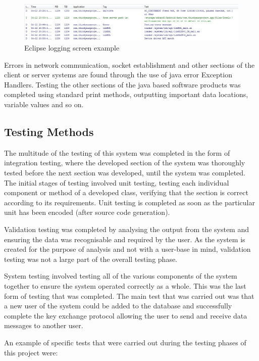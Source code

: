 \documentclass[a4paper,12pt]{report}
\begin{document}
\begin{figure}[htb]
 \centering
 \includegraphics[scale=0.5]{images/screenshots/logcatex.jpg}
 \caption{Eclipse logging screen example}
 \label{fig:logcatex}
\end{figure}

Errors in network communication, socket establishment and other sections of the client or server systems are found through the use of java error Exception Handlers. Testing the other sections of the java based software products was completed using standard print methods, outputting important data locations, variable values and so on. 

\subsection{Testing Methods}

The multitude of the testing of this system was completed in the form of integration testing, where the developed section of the system was thoroughly tested before the next section was developed, until the system was completed. The initial stages of testing involved unit testing, testing each individual component or method of a developed class, verifying that the section is correct according to its requirements. Unit testing is completed as soon as the particular unit has been encoded (after source code generation). 

Validation testing was completed by analysing the output from the system and ensuring the data was recognisable and required by the user. As the system is created for the purpose of analysis and not with a user-base in mind, validation testing was not a large part of the overall testing phase. 

System testing involved testing all of the various components of the system together to ensure the system operated correctly as a whole. This was the last form of testing that was completed. The main test that was carried out was that a new user of the system could be added to the database and successfully complete the key exchange protocol allowing the user to send and receive data messages to another user.  

An example of specific tests that were carried out during the testing phases of this project were:
\end{document}
